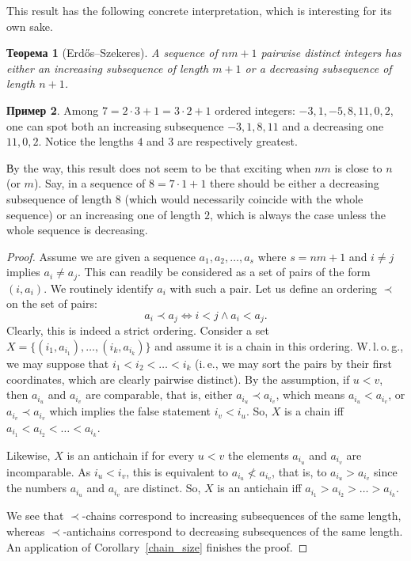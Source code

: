 \documentclass[12pt,notitlepage]{article}
\theoremstyle{plain}
\newtheorem{thm}{Теорема}[section]
\theoremstyle{definition}
\newtheorem{exm}[thm]{Пример}
\theoremstyle{plain}
\newcommand{\1}{\mathbf{1}}
\newcommand{\0}{\mathbf{0}}
\begin{document}
This result has the following concrete interpretation, which is interesting for its own sake.
\begin{thm}[Erd\H{o}s--Szekeres]
	A sequence of $nm + 1$ pairwise distinct integers has either an increasing subsequence of length $m + 1$ or a decreasing subsequence of length $n + 1$.
\end{thm}
\begin{exm} Among $7 = 2 \cdot 3 + 1 = 3 \cdot 2 + 1$ ordered integers: $-3, 1, -5, 8, 11, 0, 2$, one can spot both an increasing subsequence $-3, 1, 8, 11$ and a decreasing one $11, 0, 2$. Notice the lengths $4$ and $3$ are respectively greatest.
	
	Вy the way, this result does not seem to be that exciting when $n m$ is close to $n$ (or $m$). Say, in a sequence of $8 = 7\cdot1 + 1$ there should be either a decreasing subsequence of length $8$ (which would necessarily coincide with the whole sequence) or an increasing one of length $2$, which is always the case unless the whole sequence is decreasing.
\end{exm}
\begin{proof}
	Assume we are given a sequence $a_1, a_2, \ldots, a_s$ where $s = nm + 1$ and $i \neq j$ implies $a_i \neq a_j$. This can readily be considered as a set of pairs of the form $(i, a_i)$. We routinely identify $a_i$ with such a pair. Let us define an ordering $\prec$ on the set of pairs:
	$$a_i \prec a_j \iff i < j \wedge a_i < a_j.$$
	Clearly, this is indeed a strict ordering.  Consider a set $X = \{ (i_1, a_{i_1}),\ldots, (i_k, a_{i_k}) \}$ and assume it is a chain in this ordering. W.\,l.\,o.\,g., we may suppose that $i_1 < i_2 < \ldots < i_k$ (i.\,e., we may sort the pairs by their first coordinates, which are clearly pairwise distinct). By the assumption, if $u < v$, then $a_{i_u}$ and $a_{i_v}$ are comparable, that is, either $a_{i_u} \prec a_{i_v}$, which means $a_{i_u} < a_{i_v}$, or $a_{i_v} \prec a_{i_v}$ which implies the false statement $i_v < i_u$. So, $X$ is a chain iff $a_{i_1} < a_{i_2} < \ldots < a_{i_k}$.
	
	Likewise, $X$ is an antichain if for every $u < v$ the elements $a_{i_u}$ and $a_{i_v}$ are incomparable. As $i_u < i_v$, this is equivalent to $a_{i_u} \nless a_{i_v}$, that is, to $a_{i_u} > a_{i_v}$ since the numbers $a_{i_u}$ and $a_{i_v}$ are distinct. So, $X$ is an antichain iff $a_{i_1} > a_{i_2} > \ldots > a_{i_k}$.
	
	We see that ${\prec}$-chains correspond to increasing subsequences of the same length, whereas ${\prec}$-antichains correspond to decreasing subsequences of the same length. An application of Corollary~\ref{chain_size} finishes the proof.
\end{proof} 
\end{document}
